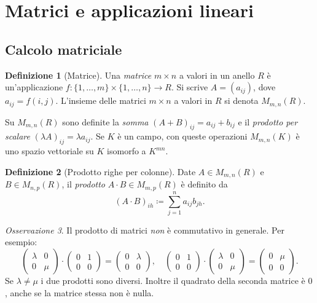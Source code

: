 \documentclass[11pt, a4paper]{book}
\theoremstyle{definition}
\newtheorem{definizione}{Definizione}[section]
\theoremstyle{plain}
\theoremstyle{remark}
\newtheorem{osservazione}[definizione]{Osservazione}
\begin{document}
\section{Matrici e applicazioni lineari}
\label{sec:matrici}

\subsection{Calcolo matriciale}

\begin{defbox}
\begin{definizione}[Matrice]
Una \emph{matrice} $m \times n$ a valori in un anello $R$ è un'applicazione $f \colon \{1,\ldots,m\} \times \{1,\ldots,n\} \to R$. Si scrive $A = (a_{ij})$, dove $a_{ij} = f(i,j)$. L'insieme delle matrici $m \times n$ a valori in $R$ si denota $M_{m,n}(R)$.
\end{definizione}
\end{defbox}

Su $M_{m,n}(R)$ sono definite la \emph{somma} $(A+B)_{ij} = a_{ij}+b_{ij}$ e il \emph{prodotto per scalare} $(\lambda A)_{ij} = \lambda a_{ij}$. Se $K$ è un campo, con queste operazioni $M_{m,n}(K)$ è uno spazio vettoriale su $K$ isomorfo a $K^{mn}$.

\begin{defbox}
\begin{definizione}[Prodotto righe per colonne]
Date $A \in M_{m,n}(R)$ e $B \in M_{n,p}(R)$, il \emph{prodotto} $A \cdot B \in M_{m,p}(R)$ è definito da
\[
  (A \cdot B)_{ih} \coloneqq \sum_{j=1}^n a_{ij} b_{jh}.
\]
\end{definizione}
\end{defbox}

\begin{osservazione}
Il prodotto di matrici \emph{non} è commutativo in generale. Per esempio:
\[
  \begin{pmatrix} \lambda & 0 \\ 0 & \mu \end{pmatrix} \cdot \begin{pmatrix} 0 & 1 \\ 0 & 0 \end{pmatrix} = \begin{pmatrix} 0 & \lambda \\ 0 & 0 \end{pmatrix}, \quad
  \begin{pmatrix} 0 & 1 \\ 0 & 0 \end{pmatrix} \cdot \begin{pmatrix} \lambda & 0 \\ 0 & \mu \end{pmatrix} = \begin{pmatrix} 0 & \mu \\ 0 & 0 \end{pmatrix}.
\]
Se $\lambda \neq \mu$ i due prodotti sono diversi. Inoltre il quadrato della seconda matrice è $0$, anche se la matrice stessa non è nulla.
\end{osservazione}
\end{document}
